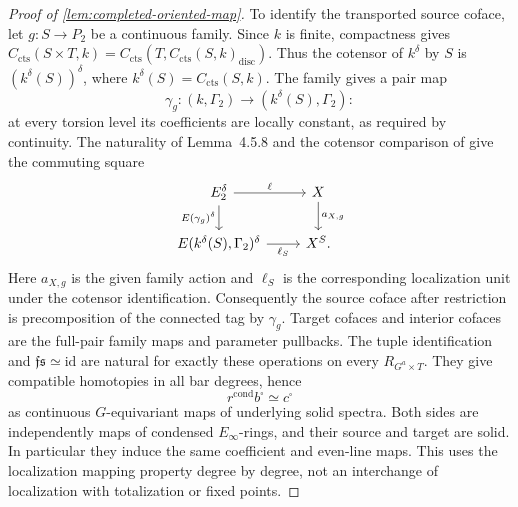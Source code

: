 \documentclass[11pt]{article}
\numberwithin{equation}{section}
\theoremstyle{definition}
\theoremstyle{remark}
\newcommand{\cts}{\mathrm{cts}}
\begin{document}
\begin{proof}[Proof of \cref{lem:completed-oriented-map}]
To identify the transported source coface, let \(g:S\to P_2\) be a
continuous family. Since \(k\) is finite, compactness gives
\(C_{\cts}(S\times T,k)=C_{\cts}(T,C_{\cts}(S,k)_{\mathrm{disc}})\).
Thus the cotensor of \(k^\delta\) by \(S\) is
\((k^\delta(S))^\delta\), where \(k^\delta(S)=C_{\cts}(S,k)\).
The family gives a pair map
\[
 \gamma_g:(k,\Gamma_2)\longrightarrow(k^\delta(S),\Gamma_2):
\]
at every torsion level its coefficients are locally constant, as required
by continuity. The naturality of Lemma~4.5.8 and the cotensor comparison
of \cite[Remark~4.5.6]{BMR2026} give the commuting square
\[
 \begin{tikzcd}
 E_2^\delta \arrow[r,"\ell"]
   \arrow[d,"E(\gamma_g)^\delta"'] &
 X \arrow[d,"a_{X,g}"]\\
 E(k^\delta(S),\Gamma_2)^\delta \arrow[r,"\ell_S"'] & X^S .
 \end{tikzcd}
\]
Here \(a_{X,g}\) is the given family action and \(\ell_S\) is the
corresponding localization unit under the cotensor identification.
Consequently the source coface after restriction is precomposition of the
connected tag by \(\gamma_g\). Target cofaces and interior cofaces are the
full-pair family maps and parameter pullbacks. The tuple identification
and \(\mathfrak f\mathfrak s\simeq\mathrm{id}\) are natural for exactly
these operations on every \(R_{G^a\times T}\). They give compatible
homotopies in all bar degrees, hence
\[
 r^{\mathrm{cond}}b^\square\simeq c^\square
\]
as continuous \(G\)-equivariant maps of underlying solid spectra.
Both sides are independently maps of condensed \(E_\infty\)-rings, and
their source and target are solid. In particular they induce the same
coefficient and even-line maps. This uses the localization mapping
property degree by degree, not an interchange of localization with
totalization or fixed points.

\end{proof}

\begingroup
\small
\raggedright


\endgroup
\end{document}
